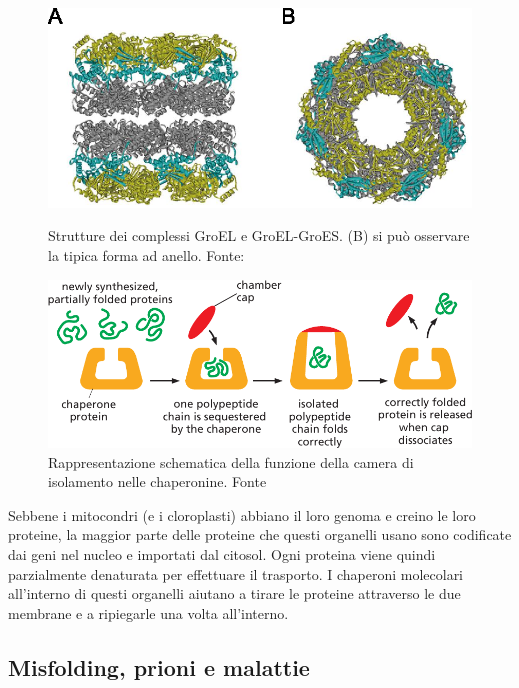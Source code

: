 {\begin{figure}[h]
	
\end{figure}

\begin{figure}[!htb]
	\includegraphics[scale=0.25]{images/groel.png}
	\caption{Strutture dei complessi GroEL e GroEL-GroES. (B) si può osservare la tipica forma ad anello. Fonte: \cite{Iizuka2016ChaperoninGU}}
	\label{fig:groel}
	\endminipage\hfill
	\centering
	\includegraphics[scale=0.4]{images/chaperone-alberts-isolation.png}
	\caption{Rappresentazione schematica della funzione della camera di isolamento nelle chaperonine. Fonte \cite{alberts2018essential}}
	\label{fig:chaperone-camera}
	\endminipage\hfill
\end{figure}

Sebbene i mitocondri (e i cloroplasti) abbiano il loro genoma e creino le loro proteine, la maggior parte delle proteine che questi organelli usano sono codificate dai geni nel nucleo e importati dal citosol. Ogni proteina viene quindi parzialmente denaturata per effettuare il trasporto. I chaperoni molecolari all'interno di questi organelli aiutano a tirare le proteine attraverso le due membrane e a ripiegarle una volta all'interno\supercite{alberts2018essential}.


\subsection{Misfolding, prioni e malattie}
{
	
}}
